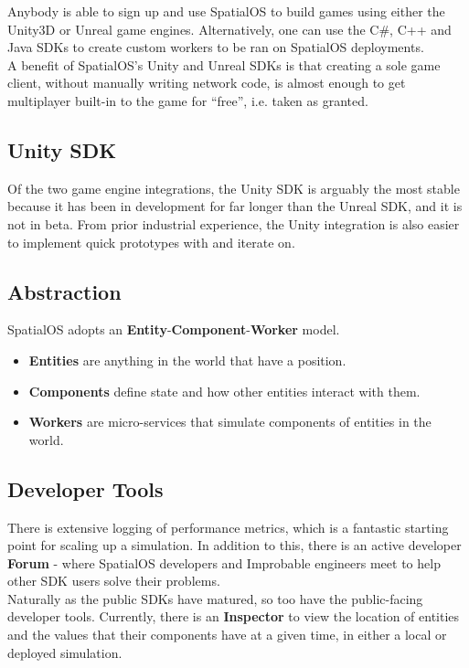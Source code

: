 \documentclass[a4paper,11pt,titlepage]{report}
\begin{document}
Anybody is able to sign up and use SpatialOS to build games using either the Unity3D or Unreal game engines. Alternatively, one can use the C\#, C++ and Java SDKs to create custom workers to be ran on SpatialOS deployments. \\

A benefit of SpatialOS's Unity and Unreal SDKs is that creating a sole game client, without manually writing network code, is almost enough to get multiplayer built-in to the game for ``free'', i.e. taken as granted.

\subsection{Unity SDK}
Of the two game engine integrations, the Unity SDK is arguably the most stable because it has been in development for far longer than the Unreal SDK, and it is not in beta. From prior industrial experience, the Unity integration is also easier to implement quick prototypes with and iterate on.

\subsection{Abstraction}
SpatialOS adopts an \textbf{Entity}-\textbf{Component}-\textbf{Worker} model.
\begin{itemize}
  \item \textbf{Entities} are anything in the world that have a position.
  \item \textbf{Components} define state and how other entities interact with them.
  \item \textbf{Workers} are micro-services that simulate components of entities in the world.
\end{itemize}

\subsection{Developer Tools}
There is extensive logging of performance metrics, which is a fantastic starting point for scaling up a simulation\cite{Brighting}. In addition to this, there is an active developer \textbf{Forum} - where SpatialOS developers and Improbable engineers meet to help other SDK users solve their problems\cite{ImprobableWorldsLtd.2018c}. \\

Naturally as the public SDKs have matured, so too have the public-facing developer tools. Currently, there is an \textbf{Inspector} to view the location of entities and the values that their components have at a given time, in either a local or deployed simulation.
\end{document}
